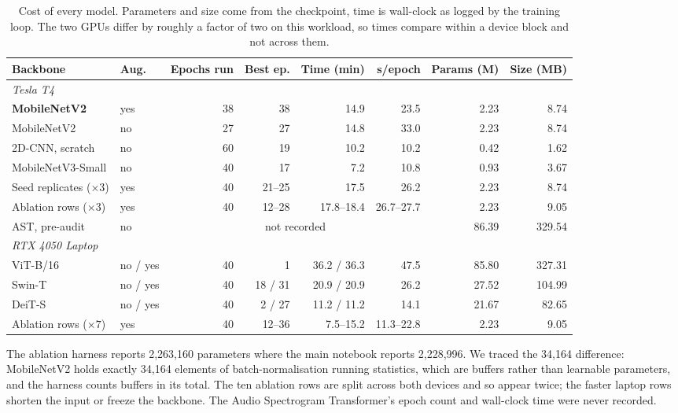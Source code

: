 \documentclass[journal,onecolumn]{IEEEtran}
\newcommand{\best}[1]{\textbf{#1}}
\begin{document}
\begin{table}[!t]
\centering
\caption{Cost of every model. Parameters and size come from the checkpoint, time is
wall-clock as logged by the training loop. The two GPUs differ by roughly a factor of two on
this workload, so times compare within a device block and not across them.}
\label{tab:efficiency}
\footnotesize
\begin{tabular}{llrrrrrr}
\toprule
Backbone & Aug. & Epochs run & Best ep. & Time (min) & s/epoch & Params (M) & Size (MB) \\
\midrule
\multicolumn{8}{l}{\emph{Tesla T4}}\\
\best{MobileNetV2} & yes & 38 & 38 & \phantom{0}14.9 & 23.5 & \phantom{0}2.23 & \phantom{00}8.74 \\
MobileNetV2 & no & 27 & 27 & \phantom{0}14.8 & 33.0 & \phantom{0}2.23 & \phantom{00}8.74 \\
2D-CNN, scratch & no & 60 & 19 & \phantom{0}10.2 & 10.2 & \phantom{0}0.42 & \phantom{00}1.62 \\
MobileNetV3-Small & no & 40 & 17 & \phantom{00}7.2 & 10.8 & \phantom{0}0.93 & \phantom{00}3.67 \\
Seed replicates ($\times3$) & yes & 40 & 21--25 & \phantom{0}17.5 & 26.2 & \phantom{0}2.23 & \phantom{00}8.74 \\
Ablation rows ($\times3$) & yes & 40 & 12--28 & 17.8--18.4 & 26.7--27.7 & \phantom{0}2.23 & \phantom{00}9.05 \\
AST, pre-audit & no & \multicolumn{4}{c}{not recorded} & 86.39 & 329.54 \\
\midrule
\multicolumn{8}{l}{\emph{RTX 4050 Laptop}}\\
ViT-B/16 & no / yes & 40 & \phantom{0}1 & \phantom{0}36.2 / 36.3 & 47.5 & 85.80 & 327.31 \\
Swin-T   & no / yes & 40 & 18 / 31 & \phantom{0}20.9 / 20.9 & 26.2 & 27.52 & 104.99 \\
DeiT-S   & no / yes & 40 & \phantom{0}2 / 27 & \phantom{0}11.2 / 11.2 & 14.1 & 21.67 & \phantom{0}82.65 \\
Ablation rows ($\times7$) & yes & 40 & 12--36 & \phantom{0}7.5--15.2 & 11.3--22.8 & \phantom{0}2.23 & \phantom{00}9.05 \\
\bottomrule
\end{tabular}

\vspace{2pt}
\footnotesize The ablation harness reports 2,263,160 parameters where the main notebook reports
2,228,996. We traced the 34,164 difference: MobileNetV2 holds exactly 34,164 elements of
batch-normalisation running statistics, which are buffers rather than learnable parameters, and
the harness counts buffers in its total. The ten ablation rows are split across both devices and
so appear twice; the faster laptop rows shorten the input or freeze the backbone. The Audio
Spectrogram Transformer's epoch count and wall-clock time were never recorded.
\end{table}
\end{document}
